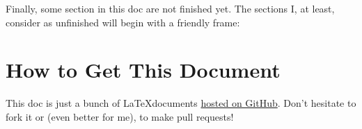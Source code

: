 
Finally, some section in this doc are not finished yet. The sections I, at least, consider as unfinished will begin with a friendly frame:


\section*{How to Get This Document}

This doc is just a bunch of \LaTeX documents \href{http://github.com/PhilippeSigaud/D-templates-tutorial}{hosted on GitHub}. Don't hesitate to fork it or (even better for me), to make pull requests!